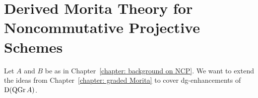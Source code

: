 \chapter{Derived Morita Theory for Noncommutative Projective Schemes} \label{section: morita for NCP}

Let \(A\) and \(B\) be as in Chapter~\ref{chapter: background on NCP}.
We want to extend the ideas from Chapter~\ref{chapter: graded Morita} to cover dg-enhancements of \(\mathrm{D}(\operatorname{QGr}A)\). 

